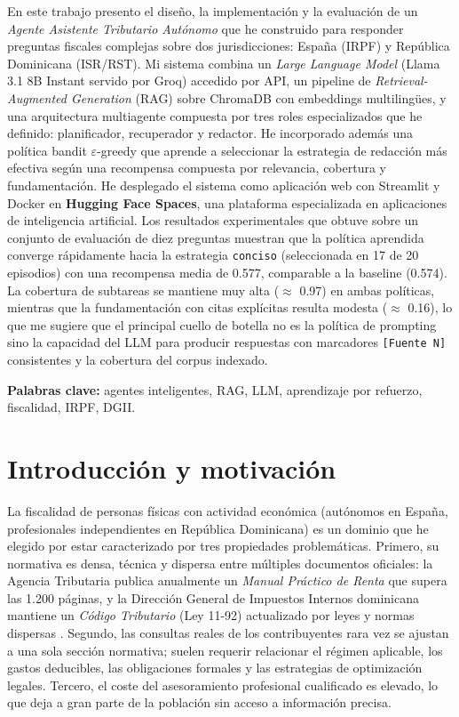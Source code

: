 \documentclass[11pt,a4paper]{article}
\begin{document}
En este trabajo presento el diseño, la implementación y la evaluación de un \emph{Agente Asistente Tributario Autónomo} que he construido para responder preguntas fiscales complejas sobre dos jurisdicciones: España (IRPF) y República Dominicana (ISR/RST). Mi sistema combina un \emph{Large Language Model} (Llama 3.1 8B Instant servido por Groq) accedido por API, un pipeline de \emph{Retrieval-Augmented Generation} (RAG) sobre ChromaDB con embeddings multilingües, y una arquitectura multiagente compuesta por tres roles especializados que he definido: planificador, recuperador y redactor. He incorporado además una política bandit $\varepsilon$-greedy que aprende a seleccionar la estrategia de redacción más efectiva según una recompensa compuesta por relevancia, cobertura y fundamentación. He desplegado el sistema como aplicación web con Streamlit y Docker en \textbf{Hugging Face Spaces}, una plataforma especializada en aplicaciones de inteligencia artificial. Los resultados experimentales que obtuve sobre un conjunto de evaluación de diez preguntas muestran que la política aprendida converge rápidamente hacia la estrategia \texttt{conciso} (seleccionada en 17 de 20 episodios) con una recompensa media de 0.577, comparable a la baseline (0.574). La cobertura de subtareas se mantiene muy alta ($\approx$ 0.97) en ambas políticas, mientras que la fundamentación con citas explícitas resulta modesta ($\approx$ 0.16), lo que me sugiere que el principal cuello de botella no es la política de prompting sino la capacidad del LLM para producir respuestas con marcadores \texttt{[Fuente~N]} consistentes y la cobertura del corpus indexado.

\textbf{Palabras clave:} agentes inteligentes, RAG, LLM, aprendizaje por refuerzo, fiscalidad, IRPF, DGII.

\newpage

\section{Introducción y motivación}

La fiscalidad de personas físicas con actividad económica (autónomos en España, profesionales independientes en República Dominicana) es un dominio que he elegido por estar caracterizado por tres propiedades problemáticas. Primero, su normativa es densa, técnica y dispersa entre múltiples documentos oficiales: la Agencia Tributaria publica anualmente un \emph{Manual Práctico de Renta} \cite{aeat2024manual} que supera las 1.200 páginas, y la Dirección General de Impuestos Internos dominicana mantiene un \emph{Código Tributario} (Ley 11-92) actualizado por leyes y normas dispersas \cite{dgii2024codigo}. Segundo, las consultas reales de los contribuyentes rara vez se ajustan a una sola sección normativa; suelen requerir relacionar el régimen aplicable, los gastos deducibles, las obligaciones formales y las estrategias de optimización legales. Tercero, el coste del asesoramiento profesional cualificado es elevado, lo que deja a gran parte de la población sin acceso a información precisa.
\end{document}
